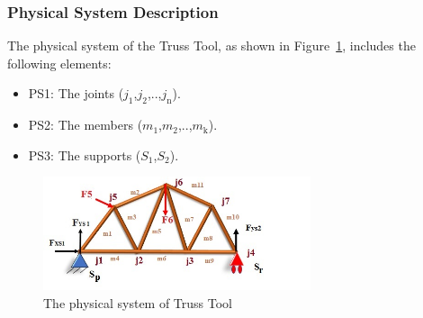 \documentclass[12pt]{article}
\begin{document}
\subsubsection{Physical System Description} \label{sec_phySystDescrip}


The physical system of the Truss Tool, as shown in Figure~\ref{fig_physys},
includes the following elements:

\begin{itemize}

\item{PS1: The joints ($j_\text{1}$,$j_\text{2}$,..,$j_\text{n}$).}
\item{PS2: The members ($m_\text{1}$,$m_\text{2}$,..,$m_\text{k}$).}
\item{PS3: The supports ($S_\text{1}$,$S_\text{2}$).}

\end{itemize}


 \begin{figure}[h!]
\begin{center}
 
  \includegraphics[width=0.7\textwidth]{physic_system.jpg}
 
 \caption{The physical system of Truss Tool}
 \label{fig_physys}
 \end{center}
 \end{figure}
\end{document}
